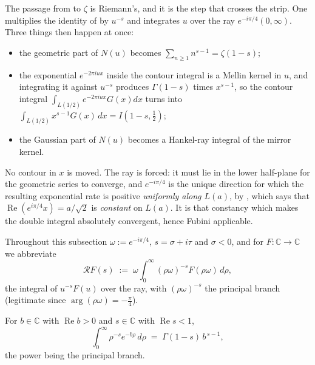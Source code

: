The passage from  to $\zeta$ is Riemann's, and it is the step that
crosses the strip.  One multiplies the identity of  by $u^{-s}$ and
integrates $u$ over the ray $e^{-i\pi/4}(0,\infty)$.  Three things then happen at once:
\begin{itemize}
  \item the geometric part of $N(u)$ becomes $\sum_{n\ge1}n^{s-1}=\zeta(1-s)$;
  \item the exponential $e^{-2\pi iux}$ inside the contour integral is a Mellin kernel in
        $u$, and integrating it against $u^{-s}$ produces $\Gamma(1-s)$ times $x^{s-1}$,
        so the contour integral $\int_{L(1/2)}e^{-2\pi iux}G(x)dx$ turns into
        $\int_{L(1/2)}x^{s-1}G(x)\,dx=I(1-s,\tfrac12)$;
  \item the Gaussian part of $N(u)$ becomes a Hankel-ray integral of the mirror kernel.
\end{itemize}
No contour in $x$ is moved.  The ray is forced: it must lie in the lower half-plane for the
geometric series to converge, and $e^{-i\pi/4}$ is the unique direction for which the
resulting exponential rate is positive \emph{uniformly along $L(a)$}, by
, which says that $\operatorname{Re}(e^{i\pi/4}x)=a/\sqrt2$ is
\emph{constant} on $L(a)$.  It is that constancy which makes the double integral absolutely
convergent, hence Fubini applicable.

Throughout this subsection $\omega:=e^{-i\pi/4}$, $s=\sigma+i\tau$ and $\sigma<0$, and for
$F:\mathbb{C}\to\mathbb{C}$ we abbreviate
\[
  \mathcal{R}F(s)\;:=\;\omega\int_{0}^{\infty}(\rho\omega)^{-s}F(\rho\omega)\,d\rho ,
\]
the integral of $u^{-s}F(u)$ over the ray, with $(\rho\omega)^{-s}$ the principal branch
(legitimate since $\arg(\rho\omega)=-\tfrac\pi4$).

\begin{lemma}
\label{lem:rsz_gamma_cplx}
\leanok
For $b\in\mathbb{C}$ with $\operatorname{Re}b>0$ and $s\in\mathbb{C}$ with
$\operatorname{Re}s<1$,
\[
  \int_{0}^{\infty}\rho^{-s}e^{-b\rho}\,d\rho\;=\;\Gamma(1-s)\,b^{\,s-1},
\]
the power being the principal branch.
\end{lemma}

